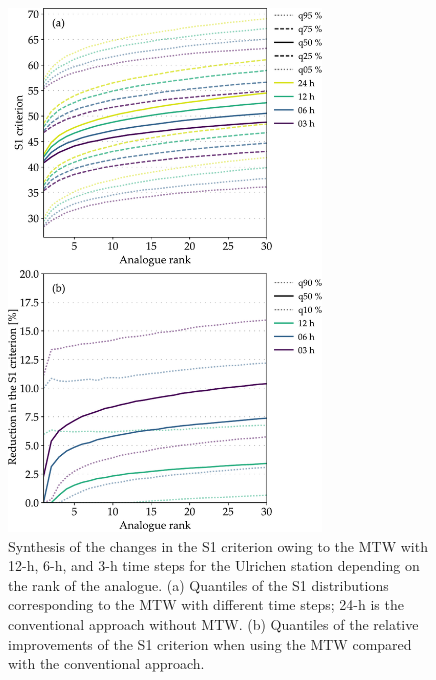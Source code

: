 \documentclass[hess, manuscript]{copernicus}
\begin{document}
	\begin{figure}[htb]
		\begin{center}
			\includegraphics[width=8.3cm]{fig04.pdf}
		\end{center}
		\caption{Synthesis of the changes in the S1 criterion owing to the MTW with 12-h, 6-h, and 3-h time steps for the Ulrichen station depending on the rank of the analogue. (a) Quantiles of the S1 distributions corresponding to the MTW with different time steps; 24-h is the conventional approach without MTW. (b) Quantiles of the relative improvements of the S1 criterion when using the MTW compared with the conventional approach.}
		\label{fig:changes_S1}
	\end{figure}
	
\end{document}
